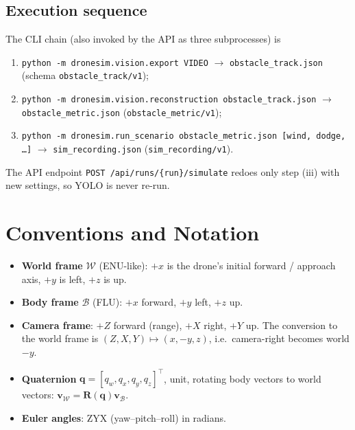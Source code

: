 \documentclass[11pt,a4paper]{article}
\newcommand{\vc}[1]{\bm{#1}}
\newcommand{\code}[1]{\texttt{\small #1}}
\begin{document}
\subsection{Execution sequence}
The CLI chain (also invoked by the API as three subprocesses) is
\begin{enumerate}[label=(\roman*)]
\item \code{python -m dronesim.vision.export VIDEO} $\to$ \code{obstacle\_track.json} (schema \code{obstacle\_track/v1});
\item \code{python -m dronesim.vision.reconstruction obstacle\_track.json} $\to$ \code{obstacle\_metric.json} (\code{obstacle\_metric/v1});
\item \code{python -m dronesim.run\_scenario obstacle\_metric.json [wind, dodge, \dots]} $\to$ \code{sim\_recording.json} (\code{sim\_recording/v1}).
\end{enumerate}
The API endpoint \code{POST /api/runs/\{run\}/simulate} redoes only step (iii) with new settings, so YOLO is never re-run.

\section{Conventions and Notation}
\begin{itemize}
\item \textbf{World frame} $\mathcal W$ (ENU-like): $+x$ is the drone's initial forward / approach axis, $+y$ is left, $+z$ is up.
\item \textbf{Body frame} $\mathcal B$ (FLU): $+x$ forward, $+y$ left, $+z$ up.
\item \textbf{Camera frame}: $+Z$ forward (range), $+X$ right, $+Y$ up. The conversion to the world frame is
$(Z,X,Y)\mapsto(x,-y,z)$, i.e.\ camera-right becomes world $-y$.
\item \textbf{Quaternion} $\vc q=[q_w,q_x,q_y,q_z]^\top$, unit, rotating body vectors to world vectors: $\vc v_{\mathcal W}=\vc R(\vc q)\vc v_{\mathcal B}$.
\item \textbf{Euler angles}: ZYX (yaw--pitch--roll) in radians.
\end{itemize}
\end{document}

